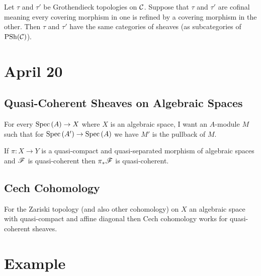 \documentclass[12pt]{article}
\begin{document}
\begin{cor}
Let $\tau$ and $\tau'$ be Grothendieck topologies on $\mathcal{C}$. Suppose that $\tau$ and $\tau'$ are cofinal meaning every covering morphism in one is refined by a covering morphism in the other. Then $\tau$ and $\tau'$ have the same categories of sheaves (as subcategories of $\mathrm{PSh}(\mathcal{C})$). 
\end{cor}

\section{April 20}

\subsection{Quasi-Coherent Sheaves on Algebraic Spaces}

For every $\mathrm{Spec}\left( A \right) \to X$ where $X$ is an algebraic space, I want an $A$-module $M$ such that for $\mathrm{Spec}\left( A' \right) \to \mathrm{Spec}\left( A \right)$ we have $M'$ is the pullback of $M$. 

\begin{prop}
If $\pi : X \to Y$ is a quasi-compact and quasi-separated morphism of algebraic spaces and $\mathscr{F}$ is quasi-coherent then $\pi_* \mathscr{F}$ is quasi-coherent.
\end{prop}

\subsection{Cech Cohomology}

For the Zariski topology (and also other cohomology) on $X$ an algebraic space with quasi-compact and affine diagonal then Cech cohomology works for quasi-coherent sheaves.

\section{Example}
\end{document}
